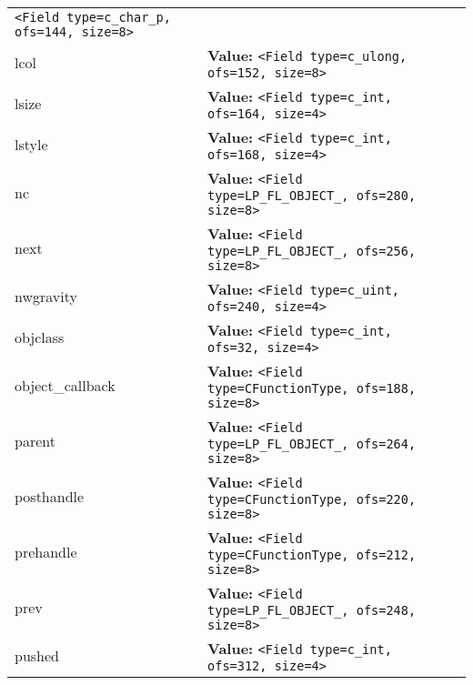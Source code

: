 \begin{longtable}{|p{\varnamewidth}|p{\vardescrwidth}|l}
{\tt {\textless}Field type=c\_char\_p, ofs=144, size=8{\textgreater}}&\\
\cline{1-2}
\raggedright l\-c\-o\-l\- & \raggedright \textbf{Value:} 
{\tt {\textless}Field type=c\_ulong, ofs=152, size=8{\textgreater}}&\\
\cline{1-2}
\raggedright l\-s\-i\-z\-e\- & \raggedright \textbf{Value:} 
{\tt {\textless}Field type=c\_int, ofs=164, size=4{\textgreater}}&\\
\cline{1-2}
\raggedright l\-s\-t\-y\-l\-e\- & \raggedright \textbf{Value:} 
{\tt {\textless}Field type=c\_int, ofs=168, size=4{\textgreater}}&\\
\cline{1-2}
\raggedright n\-c\- & \raggedright \textbf{Value:} 
{\tt {\textless}Field type=LP\_FL\_OBJECT\_, ofs=280, size=8{\textgreater}}&\\
\cline{1-2}
\raggedright n\-e\-x\-t\- & \raggedright \textbf{Value:} 
{\tt {\textless}Field type=LP\_FL\_OBJECT\_, ofs=256, size=8{\textgreater}}&\\
\cline{1-2}
\raggedright n\-w\-g\-r\-a\-v\-i\-t\-y\- & \raggedright \textbf{Value:} 
{\tt {\textless}Field type=c\_uint, ofs=240, size=4{\textgreater}}&\\
\cline{1-2}
\raggedright o\-b\-j\-c\-l\-a\-s\-s\- & \raggedright \textbf{Value:} 
{\tt {\textless}Field type=c\_int, ofs=32, size=4{\textgreater}}&\\
\cline{1-2}
\raggedright o\-b\-j\-e\-c\-t\-\_\-c\-a\-l\-l\-b\-a\-c\-k\- & \raggedright \textbf{Value:} 
{\tt {\textless}Field type=CFunctionType, ofs=188, size=8{\textgreater}}&\\
\cline{1-2}
\raggedright p\-a\-r\-e\-n\-t\- & \raggedright \textbf{Value:} 
{\tt {\textless}Field type=LP\_FL\_OBJECT\_, ofs=264, size=8{\textgreater}}&\\
\cline{1-2}
\raggedright p\-o\-s\-t\-h\-a\-n\-d\-l\-e\- & \raggedright \textbf{Value:} 
{\tt {\textless}Field type=CFunctionType, ofs=220, size=8{\textgreater}}&\\
\cline{1-2}
\raggedright p\-r\-e\-h\-a\-n\-d\-l\-e\- & \raggedright \textbf{Value:} 
{\tt {\textless}Field type=CFunctionType, ofs=212, size=8{\textgreater}}&\\
\cline{1-2}
\raggedright p\-r\-e\-v\- & \raggedright \textbf{Value:} 
{\tt {\textless}Field type=LP\_FL\_OBJECT\_, ofs=248, size=8{\textgreater}}&\\
\cline{1-2}
\raggedright p\-u\-s\-h\-e\-d\- & \raggedright \textbf{Value:} 
{\tt {\textless}Field type=c\_int, ofs=312, size=4{\textgreater}}&\\

\end{longtable}
